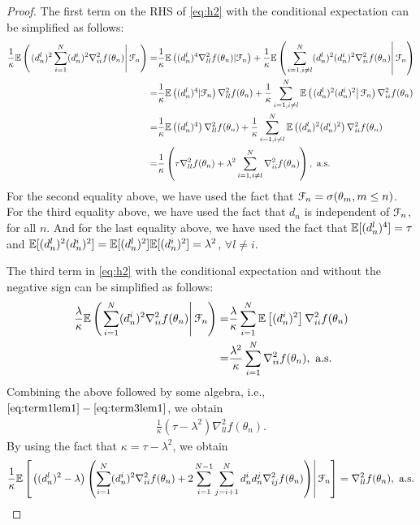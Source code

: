 \begin{proof}
The first term on the RHS of \eqref{eq:h2} with the conditional expectation can be simplified as follows:
\begin{align}\label{eq:term1lem1}
\dfrac{1}{\kappa} \mathbb{E}\left(\left. (d_n^l)^2 \sum\limits_{i=1}^N (d_n^i)^2 \nabla^2_{ii} f(\theta_n) \right| \mathcal{F}_n\right)
= & \dfrac{1}{\kappa} \mathbb{E}\left((d_n^l)^4 \nabla^2_{ll} f(\theta_n)| \mathcal{F}_n\right) + \dfrac{1}{\kappa} \mathbb{E}\left(\left.\sum\limits_{i=1,i\ne l}^N (d_n^l)^2(d_n^i)^2 \nabla^2_{ii} f(\theta_n)\right|\mathcal{F}_n\right)\nonumber\\
= & \dfrac{1}{\kappa} \mathbb{E}\left((d_n^l)^4| \mathcal{F}_n\right) \nabla^2_{ll} f(\theta_n) + \dfrac{1}{\kappa} \sum\limits_{i=1,i\ne l}^N \mathbb{E}\left(\left.(d_n^l)^2(d_n^i)^2\right| \mathcal{F}_n\right) \nabla^2_{ii} f(\theta_n) \nonumber\\
= & \dfrac{1}{\kappa} \mathbb{E}\left((d_n^l)^4\right) \nabla^2_{ll} f(\theta_n) + \dfrac{1}{\kappa} \sum\limits_{i=1,i\ne l}^N \mathbb{E}\left((d_n^l)^2(d_n^i)^2\right) \nabla^2_{ii} f(\theta_n) \nonumber\\
= & \dfrac{1}{\kappa} \left( \tau \nabla^2_{ll} f(\theta_n) + \lambda^2 \sum\limits_{i=1,i\ne l}^N  \nabla^2_{ii} f(\theta_n) \right), \text{ a.s.}
\end{align} 
For the second equality above, we have used the fact that $\mathcal{F}_n = \sigma(\theta_m,m\le n)$. For the third equality above, we have used the fact that $d_n$ is independent of $\mathcal{F}_n$, for all $n$. And for the last equality above, we have used the fact that $\mathbb{E}[(d_n^l)^4] =  \tau$ and $\mathbb{E}[(d_n^l)^2 (d_n^i)^2] = \mathbb{E}[(d_n^l)^2] \mathbb{E}[(d_n^i)^2] = \lambda^2$, $\forall l \ne i$.

The third term in \eqref{eq:h2} with the conditional expectation and without the negative sign can be simplified as follows: 
\begin{align}\label{eq:term3lem1}
\dfrac{ \lambda}{\kappa} \mathbb{E}\left(\left. \sum\limits_{i=1}^N (d_n^i)^2 \nabla^2_{ii} f(\theta_n) \right| \mathcal{F}_n\right)
= &\dfrac{ \lambda}{\kappa} \sum\limits_{i=1}^N \mathbb{E} \left[(d_n^i)^2\right] \nabla^2_{ii} f(\theta_n) \nonumber \\
=  &\dfrac{\lambda^2}{\kappa} \sum\limits_{i=1}^N \nabla^2_{ii} f(\theta_n), \text{ a.s.}
\end{align} 
Combining the above followed by some algebra, i.e., $\eqref{eq:term1lem1}-\eqref{eq:term3lem1}$, we obtain
\begin{align*}
\frac{1}{\kappa} (\tau - \lambda^2) \nabla^2_{ll} f(\theta_n).
\end{align*} 
By using the fact that $\kappa = \tau - \lambda^2$, we obtain
\begin{align*}
\dfrac{1}{\kappa}  \mathbb{E}\left[\left. \left((d_n^l)^2-\lambda\right) \left(\sum\limits_{i=1}^N (d_n^i)^2 \nabla^2_{ii} f(\theta_n) 
+ 2\sum\limits_{i=1}^{N-1}\sum\limits_{j=i+1}^N d_n^i d_n^j \nabla^2_{ij} f(\theta_n)\right)\right| \mathcal{F}_n\right] = \nabla^2_{ll} f(\theta_n), \text{ a.s.}
\end{align*}


\end{proof}
